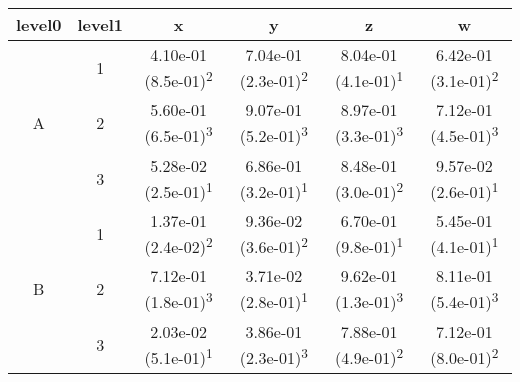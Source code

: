 \begin{tabular}{cccccc}
\toprule
level0 & level1&x&y&z&w\tabularnewline
\midrule
\multirow{3}{*}{A}&1& 4.10e-01 (8.5e-01)\textsuperscript{2}& 7.04e-01 (2.3e-01)\textsuperscript{2}& 8.04e-01 (4.1e-01)\textsuperscript{1}& 6.42e-01 (3.1e-01)\textsuperscript{2}\tabularnewline
&2& 5.60e-01 (6.5e-01)\textsuperscript{3}& 9.07e-01 (5.2e-01)\textsuperscript{3}& 8.97e-01 (3.3e-01)\textsuperscript{3}& 7.12e-01 (4.5e-01)\textsuperscript{3}\tabularnewline
&3& 5.28e-02 (2.5e-01)\textsuperscript{1}& 6.86e-01 (3.2e-01)\textsuperscript{1}& 8.48e-01 (3.0e-01)\textsuperscript{2}& 9.57e-02 (2.6e-01)\textsuperscript{1}\tabularnewline
\midrule
\multirow{3}{*}{B}&1& 1.37e-01 (2.4e-02)\textsuperscript{2}& 9.36e-02 (3.6e-01)\textsuperscript{2}& 6.70e-01 (9.8e-01)\textsuperscript{1}& 5.45e-01 (4.1e-01)\textsuperscript{1}\tabularnewline
&2& 7.12e-01 (1.8e-01)\textsuperscript{3}& 3.71e-02 (2.8e-01)\textsuperscript{1}& 9.62e-01 (1.3e-01)\textsuperscript{3}& 8.11e-01 (5.4e-01)\textsuperscript{3}\tabularnewline
&3& 2.03e-02 (5.1e-01)\textsuperscript{1}& 3.86e-01 (2.3e-01)\textsuperscript{3}& 7.88e-01 (4.9e-01)\textsuperscript{2}& 7.12e-01 (8.0e-01)\textsuperscript{2}\tabularnewline
\bottomrule
\end{tabular}
